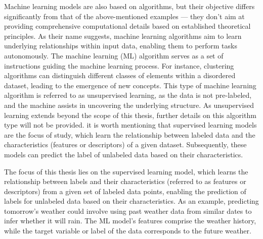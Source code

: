 \documentclass[main]{subfiles}
\begin{document}
Machine learning models are also based on algorithms, but their objective differs significantly from that of the above-mentioned examples --- they don't aim at providing comprehensive computational details based on established theoretical principles. As their name suggests, machine learning algorithms aim to learn underlying relationships within input data, enabling them to perform tasks autonomously. The machine learning (ML) algorithm serves as a set of instructions guiding the machine learning process. For instance, clustering algorithms can distinguish different classes of elements within a disordered dataset, leading to the emergence of new concepts. This type of machine learning algorithm is referred to as unsupervised learning, as the data is not pre-labeled, and the machine assists in uncovering the underlying structure. As unsupervised learning extends beyond the scope of this thesis, further details on this algorithm type will not be provided.  it is worth mentioning that supervised learning models are the focus of study, which learn the relationship between labeled data and the characteristics (features or descriptors) of a given dataset. Subsequently, these models can predict the label of unlabeled data based on their characteristics.

The focus of this thesis lies on the supervised learning model, which learns the relationship between labels and their characteristics (referred to as features or descriptors) from a given set of labeled data points, enabling the prediction of labels for unlabeled data based on their characteristics. As an example, predicting tomorrow's weather could involve using past weather data from similar dates to infer whether it will rain. The ML model's features comprise the weather history, while the target variable or label of the data corresponds to the future weather.
\end{document}
